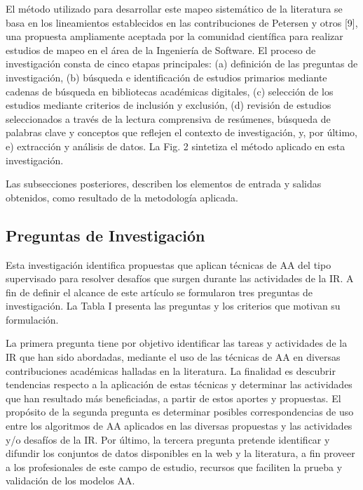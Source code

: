 \documentclass[journal]{IEEEtran}
\begin{document}
El método utilizado para desarrollar este mapeo sistemático de la literatura se basa en los lineamientos establecidos en las contribuciones de Petersen y otros \cite{petersen2008systematic}[9], una propuesta ampliamente aceptada por la comunidad científica para realizar estudios de mapeo en el área de la Ingeniería de Software. El proceso de investigación consta de cinco etapas principales: (a) definición de las preguntas de investigación, (b) búsqueda e identificación de estudios primarios mediante cadenas de búsqueda en bibliotecas académicas digitales, (c) selección de los estudios mediante criterios de inclusión y exclusión, (d) revisión de estudios seleccionados a través de la lectura comprensiva de resúmenes, búsqueda de palabras clave y conceptos que reflejen el contexto de investigación, y, por último, e) extracción y análisis de datos. La Fig. 2 sintetiza el método aplicado en esta investigación.

Las subsecciones posteriores, describen los elementos de entrada y salidas obtenidos, como resultado de la metodología aplicada.

\subsection{Preguntas de Investigación}

Esta investigación identifica propuestas que aplican técnicas de AA del tipo supervisado para resolver desafíos que surgen durante las actividades de la IR. A fin de definir el alcance de este artículo se formularon tres preguntas de investigación. La Tabla I presenta las preguntas y los criterios que motivan su formulación. 

La primera pregunta tiene por objetivo identificar las tareas y  actividades de la IR que han sido abordadas, mediante el uso de las técnicas de AA  en diversas contribuciones académicas halladas en la literatura. La finalidad es descubrir tendencias respecto a la aplicación de estas técnicas  y determinar las actividades que han resultado más beneficiadas, a partir de estos aportes y propuestas. El propósito de la segunda pregunta es determinar posibles correspondencias de uso entre los algoritmos de AA aplicados en las diversas propuestas y las actividades y/o desafíos de la IR. Por último, la tercera pregunta pretende identificar y difundir los conjuntos de datos disponibles en la web y la literatura, a fin proveer a los profesionales de este campo de estudio, recursos que faciliten la prueba y validación de los modelos AA. 
\end{document}
